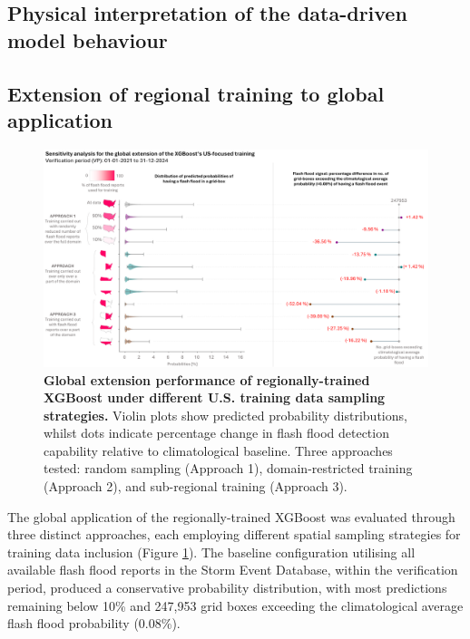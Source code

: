 \subsection{Physical interpretation of the data-driven model behaviour}



\subsection{Extension of regional training to global application}

\begin{figure}[htbp]
\centering
\includegraphics[width=\textwidth]{sensitivity_analysis_global_extension.png}
\caption{\textbf{Global extension performance of regionally-trained XGBoost under different U.S. training data sampling strategies.} Violin plots show predicted probability distributions, whilst dots indicate percentage change in flash flood detection capability relative to climatological baseline. Three approaches tested: random sampling (Approach 1), domain-restricted training (Approach 2), and sub-regional training (Approach 3).}
\label{fig:sensitivity_analysis_global_extension}
\end{figure}

The global application of the regionally-trained XGBoost was evaluated through three distinct approaches, each employing different spatial sampling strategies for training data inclusion (Figure \ref{fig:sensitivity_analysis_global_extension}). The baseline configuration utilising all available flash flood reports in the Storm Event Database, within the verification period, produced a conservative probability distribution, with most predictions remaining below 10\% and 247,953 grid boxes exceeding the climatological average flash flood probability (0.08\%).

